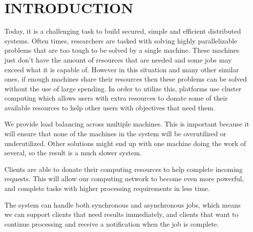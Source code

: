 \section{INTRODUCTION}\label{sec:introduction}

Today, it is a challenging task to build secured, simple and efficient distributed systems. Often times, researchers are tasked with solving highly parallelizable problems that are too tough to be solved by a single machine. These machines just don’t have the amount of resources that are needed and some jobs may exceed what it is capable of. However in this situation and many other similar ones, if enough machines share their resources then these problems can be solved without the use of large spending. In order to utilize this, platforms use cluster computing which allows users with extra resources to donate some of their available resources to help other users with objectives that need them.

We provide load balancing across multiple machines. This is important because it will ensure that none of the machines in the system will be overutilized or underutilized. Other solutions might end up with one machine doing the work of several, so the result is a much slower system.

Clients are able to donate their computing resources to help complete incoming requests. This will allow our computing network to become even more powerful, and complete tasks with higher processing requirements in less time.

The system can handle both synchronous and asynchronous jobs, which means we can support clients that need results immediately, and clients that want to continue processing and receive a notification when the job is complete.